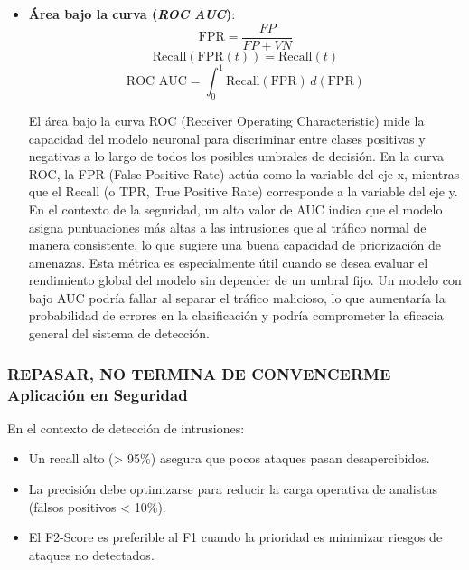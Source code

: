 \begin{itemize}
\item \textbf{Área bajo la curva (\textit{ROC AUC})}: \label{met:ROCAUC}
\begin{equation}
    \text{FPR} = \frac{FP}{FP + VN}
\end{equation}
\begin{equation}
    \text{Recall}(\text{FPR}(t)) = \text{Recall}(t)
\end{equation}
\begin{equation}
    \text{ROC AUC} = \int_{0}^{1} \text{Recall}(\text{FPR}) \, d(\text{FPR})
\end{equation}



El área bajo la curva ROC (Receiver Operating Characteristic) mide la capacidad del modelo neuronal para discriminar entre clases positivas y negativas a lo largo de todos los posibles umbrales de decisión. 
En la curva ROC, la FPR (False Positive Rate) actúa como la variable del eje x, mientras que el Recall (o TPR, True Positive Rate) corresponde a la variable del eje y. En el contexto de la seguridad, un alto valor de AUC indica que el modelo asigna puntuaciones más altas a las intrusiones que al tráfico normal de manera consistente, lo que sugiere una buena capacidad de priorización de amenazas. Esta métrica es especialmente útil cuando se desea evaluar el rendimiento global del modelo sin depender de un umbral fijo. Un modelo con bajo AUC podría fallar al separar el tráfico malicioso, lo que aumentaría la probabilidad de errores en la clasificación y podría comprometer la eficacia general del sistema de detección.

\end{itemize}

\subsubsection{REPASAR, NO TERMINA DE CONVENCERME Aplicación en Seguridad}	\label{sec:apli-met-seg}
En el contexto de detección de intrusiones:
\begin{itemize}
    \item Un recall alto (> 95\%) asegura que pocos ataques pasan desapercibidos.
    \item La precisión debe optimizarse para reducir la carga operativa de analistas (falsos positivos < 10\%).
    \item El F2-Score es preferible al F1 cuando la prioridad es minimizar riesgos de ataques no detectados.
\end{itemize}



